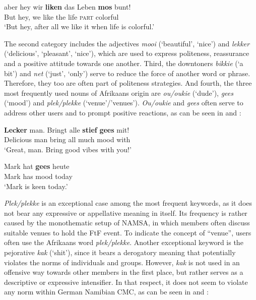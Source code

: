 \documentclass[output=paper]{langsci/langscibook}
\begin{document}
\ea
\label{ex:radke:6}
\gll aber hey wir \textbf{liken} das Leben \textbf{mos} bunt!\\
   But hey, we like the life \textsc{part}  colorful\\
\glt  `But hey, after all we like it when life is colorful.'\\
\z

The second category includes the adjectives \textit{mooi} (‘beautiful’, ‘nice’) and \textit{lekker} (‘delicious’, ‘pleasant’, ‘nice’), which are used to express politeness, reassurance and a positive attitude towards one another. Third, the downtoners \textit{bikkie} (‘a bit’) and \textit{net} (‘just’, ‘only’) serve to reduce the force of another word or phrase. Therefore, they too are often part of politeness strategies. And fourth, the three most frequently used nouns of Afrikaans origin are \textit{ou/oukie} (‘dude’), \textit{gees} (‘mood’) and \textit{plek/plekke} (‘venue’/’venues’). \textit{Ou/oukie} and \textit{gees} often serve to address other users and to prompt positive reactions, as can be seen in  and :

\ea
\label{ex:radke:7}
 \gll \textbf{Lecker} man. Bringt alle \textbf{stief} \textbf{gees} mit! \\
   		Delicious man bring all much mood with\\
     	\glt `Great, man. Bring good vibes with you!'\\
\z


\ea\label{ex:radke:8}
	\gll Mark hat \textbf{gees} heute \\
		Mark has mood today\\
     \glt `Mark is keen today.' \\
\z
 
\textit{Plek/plekke} is an exceptional case among the most frequent keywords, as it does not bear any expressive or appellative meaning in itself. Its frequency is rather caused by the monothematic setup of NAMSA, in which members often discuss suitable venues to hold the FtF event. To indicate the concept of “venue”, users often use the Afrikaans word \textit{plek/plekke}. Another exceptional keyword is the pejorative \textit{kak} (‘shit’), since it bears a derogatory meaning that potentially violates the norms of individuals and groups. However, \textit{kak} is not used in an offensive way towards other members in the first place, but rather serves as a descriptive or expressive intensifier. In that respect, it does not seem to violate any norm within German Namibian CMC, as can be seen in  and :
\end{document}
